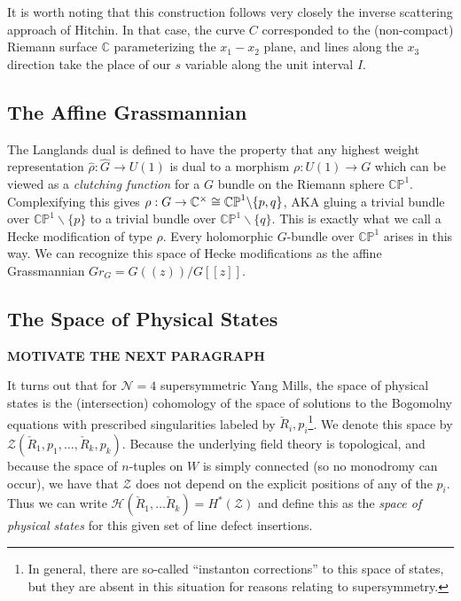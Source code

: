 	 It is worth noting that this construction follows very closely the inverse scattering approach of Hitchin\cite{hitchin1982}\cite{atiyahhitchin1988}. In that case, the curve $C$ corresponded to the (non-compact) Riemann surface $\mathbb C$ parameterizing the $x_1-x_2$ plane, and lines along the $x_3$ direction take the place of our $s$ variable along the unit interval $I$.
	
	\subsection{The Affine Grassmannian}
	
	The Langlands dual is defined to have the property that any highest weight representation $\hat \rho: \hat G \to U(1)$ is dual to a morphism $\rho: U(1) \to G$ which can be viewed as a \emph{clutching function} for a $G$ bundle on the Riemann sphere $\mathbb{CP}^1$. Complexifying this gives $\rho: G \to \mathbb{C}^\times \cong \mathbb{CP}^1 \backslash \{p, q \}$, AKA gluing a trivial bundle over $\mathbb{CP}^1 \backslash \{p \}$ to a trivial bundle over $\mathbb{CP}^1 \backslash \{q \}$. This is exactly what we call a Hecke modification of type $\rho$. Every holomorphic $G$-bundle over $\mathbb{CP}^1$ arises in this way. We can recognize this space of Hecke modifications as the affine Grassmannian $Gr_G = G((z))/G[[z]]$.
	
	\subsection{The Space of Physical States}
	
	\textbf{MOTIVATE THE NEXT PARAGRAPH}
	
	It turns out that for $\mathcal N = 4$ supersymmetric Yang Mills, the space of physical states is the (intersection) cohomology of the space of solutions to the Bogomolny equations with prescribed singularities labeled by $\check R_i, p_i$\footnote{In general, there are so-called ``instanton corrections'' to this space of states, but they are absent in this situation for reasons relating to supersymmetry.}. We denote this space by $\mathcal Z(\check R_1, p_1, \dots, \check R_k, p_k)$. Because the underlying field theory is topological, and because the space of $n$-tuples on $W$ is simply connected (so no monodromy can occur), we have that $\mathcal Z$ does not depend on the explicit positions of any of the $p_i$. Thus we can write $\mathcal H (\check R_1, \dots \check R_k) = H^*(\mathcal Z)$ and define this as the \emph{space of physical states} for this given set of line defect insertions.
	
